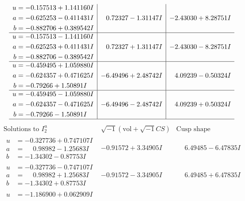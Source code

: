 \documentclass[1p]{elsarticle_modified}
\theoremstyle{definition}
\newcommand{\I}{\sqrt{-1}}
\begin{document}
$$\begin{array}{c|c|c}
\begin{aligned}
u &= -0.157513 + 1.141160 I \\
a &= -0.625253 - 0.411431 I \\
b &= -0.882706 + 0.389542 I\end{aligned}
 & \phantom{-}0.72327 - 1.31147 I & -2.43030 + 8.28751 I \\ \hline\begin{aligned}
u &= -0.157513 - 1.141160 I \\
a &= -0.625253 + 0.411431 I \\
b &= -0.882706 - 0.389542 I\end{aligned}
 & \phantom{-}0.72327 + 1.31147 I & -2.43030 - 8.28751 I \\ \hline\begin{aligned}
u &= -0.459495 + 1.059880 I \\
a &= -0.624357 + 0.471625 I \\
b &= -0.79266 + 1.50891 I\end{aligned}
 & -6.49496 + 2.48742 I & \phantom{-}4.09239 - 0.50324 I \\ \hline\begin{aligned}
u &= -0.459495 - 1.059880 I \\
a &= -0.624357 - 0.471625 I \\
b &= -0.79266 - 1.50891 I\end{aligned}
 & -6.49496 - 2.48742 I & \phantom{-}4.09239 + 0.50324 I\\
 \hline 
 \end{array}$$\newpage$$\begin{array}{c|c|c}  
\text{Solutions to }I^u_{2}& \I (\text{vol} + \sqrt{-1}CS) & \text{Cusp shape}\\
 \hline 
\begin{aligned}
u &= -0.327736 + 0.747107 I \\
a &= \phantom{-}0.98982 - 1.25683 I \\
b &= -1.34302 - 0.87753 I\end{aligned}
 & -0.91572 + 3.34905 I & \phantom{-}6.49485 - 6.47835 I \\ \hline\begin{aligned}
u &= -0.327736 - 0.747107 I \\
a &= \phantom{-}0.98982 + 1.25683 I \\
b &= -1.34302 + 0.87753 I\end{aligned}
 & -0.91572 - 3.34905 I & \phantom{-}6.49485 + 6.47835 I \\ \hline\begin{aligned}
u &= -1.186900 + 0.062909 I \\

\end{aligned}
\end{array}$$
\end{document}
